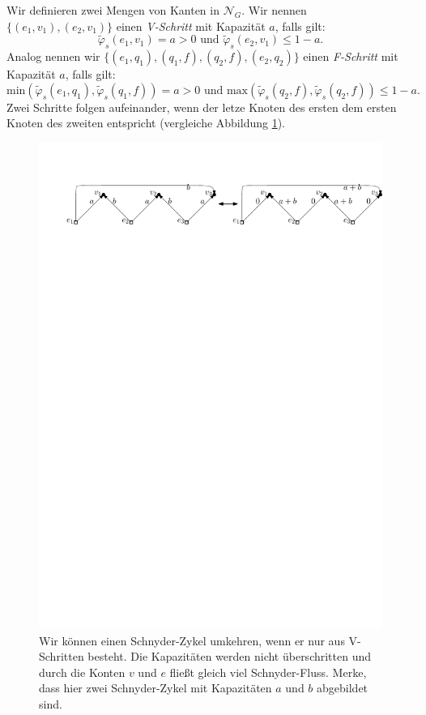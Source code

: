 \begin{definition}
Wir definieren zwei Mengen von Kanten in $\mathcal{N}_G$. Wir nennen $\{(e_1,v_1),(e_2,v_1)\}$ einen \textit{V-Schritt} mit Kapazität $a$, falls gilt: 
$$\tilde{\varphi}_s(e_1,v_1) = a > 0 \text{ und } \tilde{\varphi}_s(e_2,v_1) \leq 1 - a.$$ 
Analog nennen wir $\{(e_1,q_1),(q_1,f),(q_2,f),(e_2,q_2)\}$ einen \textit{F-Schritt} mit Kapazität $a$, falls gilt:
$$\text{min}(\tilde{\varphi}_s(e_1,q_1),\tilde{\varphi}_s(q_1,f)) = a > 0 \text{ und } \text{max}(\tilde{\varphi}_s(q_2,f),\tilde{\varphi}_s(q_2,f)) \leq 1 - a.$$
Zwei Schritte folgen aufeinander, wenn der letze Knoten des ersten dem ersten Knoten des zweiten entspricht (vergleiche Abbildung \ref{K_turn}).
\end{definition}

\begin{figure}[h]
\centering
\includegraphics[width=1\textwidth]{K_kreis.pdf}
\caption{Wir können einen Schnyder-Zykel umkehren, wenn er nur aus V-Schritten besteht. Die Kapazitäten werden nicht überschritten und durch die Konten $v$ und $e$ fließt gleich viel Schnyder-Fluss. Merke, dass hier zwei Schnyder-Zykel mit Kapazitäten $a$ und $b$ abgebildet sind.}
\label{K_turn}
\end{figure}

